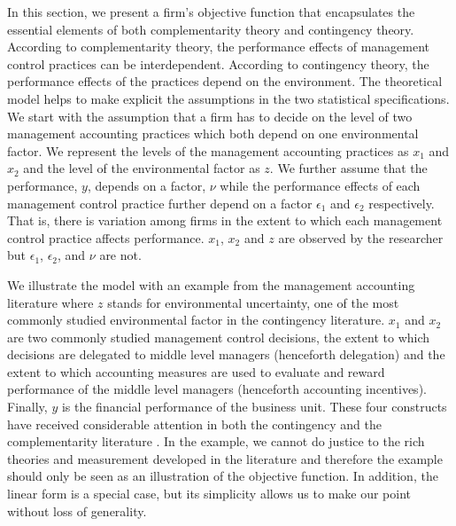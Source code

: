 \documentclass[12pt]{article}
\begin{document}
In this section, we present a firm's objective function that encapsulates the essential elements of both complementarity theory and contingency theory. According to complementarity theory, the performance effects of management control practices can be interdependent. According to contingency theory, the performance effects of the practices depend on the environment. The theoretical model helps to make explicit the assumptions in the two statistical specifications. We start with the assumption that a firm has to decide on the level of two management accounting practices which both depend on one environmental factor. We represent the levels of the management accounting practices as  $x_1$ and $x_2$ and the level of the environmental factor as $z$. We further assume that the performance, $y$, depends on a factor, $\nu$ while the performance effects of each management control practice further depend on a factor $\epsilon_1$ and $\epsilon_2$ respectively. That is, there is variation among firms in the extent to which each management control practice affects performance. $x_1$, $x_2$ and $z$ are observed by the researcher but $\epsilon_1$, $\epsilon_2$, and $\nu$ are not. 

We illustrate the model with an example from the management accounting literature where $z$ stands for environmental uncertainty, one of the most commonly studied environmental factor in the contingency literature. $x_1$ and $x_2$ are two commonly studied management control decisions, the extent to which decisions are delegated to middle level managers (henceforth delegation) and the extent to which accounting measures are used to evaluate and reward performance of the middle level managers (henceforth accounting incentives). Finally, $y$ is the financial performance of the business unit. These four constructs have received considerable attention in both the contingency and the complementarity literature \citep{grabner_management_2013,chenhall_management_2003, otley_contingency_2016}. In the example, we cannot do justice to the rich theories and measurement developed in the literature and therefore the example should only be seen as an illustration of the objective function. In addition, the linear form is a special case, but its simplicity allows us to make our point without loss of generality.
\end{document}
